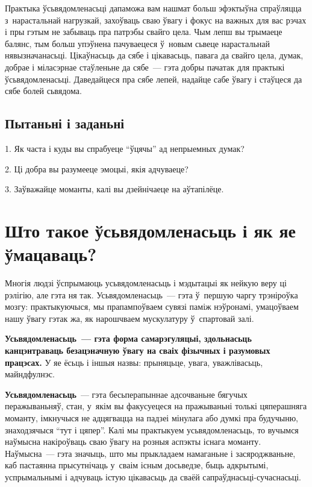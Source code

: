 Практыка ўсьвядомленасьці дапаможа вам нашмат больш эфэктыўна спраўляцца з~нарастальнай нагрузкай, захоўваць сваю ўвагу і фокус на важных для вас рэчах і пры гэтым не забываць пра патрэбы свайго цела. Чым лепш вы трымаеце балянс, тым больш упэўнена пачуваецеся ў~новым сьвеце нарастальнай нявызначанасьці. Цікаўнасьць да сябе і цікавасьць, павага да свайго цела, думак, добрае і міласэрнае стаўленьне да сябе~--- гэта добры пачатак для практыкі ўсьвядомленасьці. Даведайцеся пра сябе лепей, надайце сабе ўвагу і стаўцеся да сябе болей сьвядома.

\subsection*{Пытаньні і заданьні}

1. Як часта і куды вы спрабуеце ``ўцячы'' ад непрыемных думак?

2. Ці добра вы разумееце эмоцыі, якія адчуваеце?

3. Заўважайце моманты, калі вы дзейнічаеце на аўтапілёце.


\section{Што такое ўсьвядомленасьць і як яе ўмацаваць?}

Многія людзі ўспрымаюць усьвядомленасьць і мэдытацыі як нейкую веру ці рэлігію, але гэта ня так. Усьвядомленасьць~--- гэта ў~першую чаргу трэніроўка мозгу: практыкуючыся, мы прапампоўваем сувязі паміж нэўронамі, умацоўваем нашу ўвагу гэтак жа, як нарошчваем мускулатуру ў~спартовай залі.

\textbf{Усьвядомленасьць~--- гэта форма самарэгуляцыі, здольнасьць канцэнтраваць безацэначную ўвагу на сваіх фізычных і разумовых працэсах.} У яе ёсьць і іншыя назвы: прыняцьце, увага, уважлівасьць, майндфулнэс.

\textbf{Усьвядомленасьць}~--- гэта бесьперапыннае адсочваньне бягучых перажываньняў, стан, у~якім вы факусуецеся на пражываньні толькі цяперашняга моманту, імкнучыся не адцягвацца на падзеі мінулага або думкі пра будучыню, знаходзячыся ``тут і цяпер''. Калі мы практыкуем усьвядомленасьць, то вучымся наўмысна накіроўваць сваю ўвагу на розныя аспэкты існага моманту. Наўмысна~--- гэта значыць, што мы прыкладаем намаганьне і засяроджваньне, каб пастаянна прысутнічаць у~сваім існым досьведзе, быць адкрытымі, успрымальнымі і адчуваць істую цікавасьць да сваёй сапраўднасьці-сучаснасьці.


